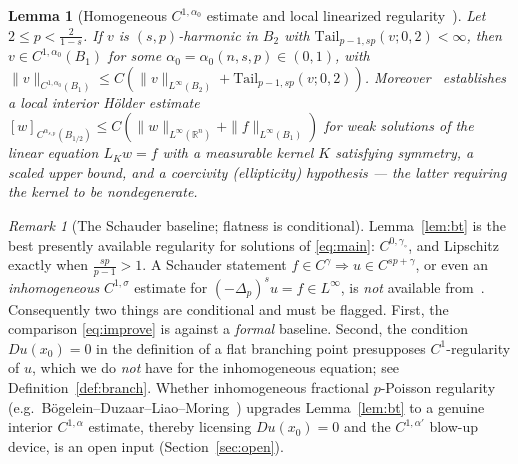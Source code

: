 \documentclass[11pt]{amsart}
\theoremstyle{plain}
\newtheorem{lemma}[theorem]{Lemma}
\theoremstyle{definition}
\theoremstyle{remark}
\newtheorem{remark}[theorem]{Remark}
\newcommand{\R}{\mathbb{R}}
\newcommand{\fpl}[1]{(-\Delta_p)^{s}#1}
\newcommand{\al}{\alpha}
\newcommand{\asp}{\alpha_{s,p}}
\newcommand{\Tail}{\mathrm{Tail}_{p-1,sp}}
\begin{document}
\begin{lemma}[Homogeneous $C^{1,\al_0}$ estimate and local linearized regularity~\cite{GJS}]\label{lem:gjs}
Let $2\le p<\frac{2}{1-s}$. If $v$ is $(s,p)$-harmonic in $B_2$ with
$\Tail(v;0,2)<\infty$, then $v\in C^{1,\al_0}(B_1)$ for some
$\al_0=\al_0(n,s,p)\in(0,1)$, with
$\|v\|_{C^{1,\al_0}(B_1)}\le C(\|v\|_{L^\infty(B_2)}+\Tail(v;0,2))$.
Moreover~\cite[\S7]{GJS} establishes a \emph{local} interior H\"older estimate
$[w]_{C^{\asp}(B_{1/2})}\le C(\|w\|_{L^\infty(\R^n)}+\|f\|_{L^\infty(B_1)})$ for
weak solutions of the linear equation $L_K w=f$ with a measurable kernel $K$
satisfying symmetry, a scaled upper bound, and a coercivity (ellipticity)
hypothesis --- the latter requiring the kernel to be \emph{nondegenerate}.
\end{lemma}

\begin{remark}[The Schauder baseline; flatness is conditional]\label{rem:baseline}
Lemma~\ref{lem:bt} is the best presently available regularity for solutions of
\eqref{eq:main}: $C^{0,\gamma_\circ}$, and Lipschitz exactly when
$\frac{sp}{p-1}>1$. A Schauder statement $f\in C^\gamma\Rightarrow u\in
C^{sp+\gamma}$, or even an \emph{inhomogeneous} $C^{1,\sigma}$ estimate for
$\fpl{u}=f\in L^\infty$, is \emph{not} available from~\cite{BT,GJS}.
Consequently two things are conditional and must be flagged. First, the
comparison \eqref{eq:improve} is against a \emph{formal} baseline. Second, the
condition $Du(x_0)=0$ in the definition of a flat branching point presupposes
$C^1$-regularity of $u$, which we do \emph{not} have for the inhomogeneous
equation; see Definition~\ref{def:branch}. Whether inhomogeneous fractional
$p$-Poisson regularity (e.g.\ B\"ogelein--Duzaar--Liao--Moring~\cite{BDLM})
upgrades Lemma~\ref{lem:bt} to a genuine interior $C^{1,\al}$ estimate, thereby
licensing $Du(x_0)=0$ and the $C^{1,\al'}$ blow-up device, is an open input
(Section~\ref{sec:open}).
\end{remark}
\end{document}
